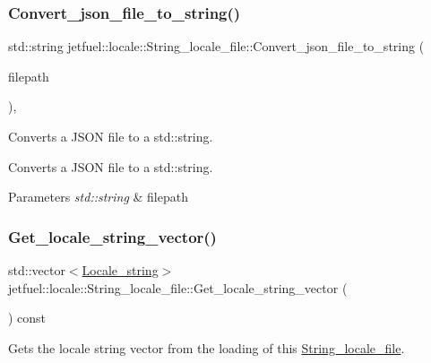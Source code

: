 \subsubsection{\texorpdfstring{Convert\+\_\+json\+\_\+file\+\_\+to\+\_\+string()}{Convert\_json\_file\_to\_string()}}
{\footnotesize\ttfamily std\+::string jetfuel\+::locale\+::\+String\+\_\+locale\+\_\+file\+::\+Convert\+\_\+json\+\_\+file\+\_\+to\+\_\+string (\begin{DoxyParamCaption}\item[{const std\+::string}]{filepath }\end{DoxyParamCaption})\hspace{0.3cm}{\ttfamily [inline]}, {\ttfamily [protected]}}



Converts a J\+S\+ON file to a std\+::string. 

Converts a J\+S\+ON file to a std\+::string.


\begin{DoxyParams}{Parameters}
{\em std\+::string} & filepath \\
\hline
\end{DoxyParams}
\mbox{\label{classjetfuel_1_1locale_1_1String__locale__file_a381a3de2e2b590fcbd6835fa7f214b11}} 
\subsubsection{\texorpdfstring{Get\+\_\+locale\+\_\+string\+\_\+vector()}{Get\_locale\_string\_vector()}}
{\footnotesize\ttfamily std\+::vector$<$\hyperlink{structjetfuel_1_1locale_1_1Locale__string}{Locale\+\_\+string}$>$ jetfuel\+::locale\+::\+String\+\_\+locale\+\_\+file\+::\+Get\+\_\+locale\+\_\+string\+\_\+vector (\begin{DoxyParamCaption}{ }\end{DoxyParamCaption}) const\hspace{0.3cm}{\ttfamily [inline]}}



Gets the locale string vector from the loading of this \hyperlink{classjetfuel_1_1locale_1_1String__locale__file}{String\+\_\+locale\+\_\+file}. 

